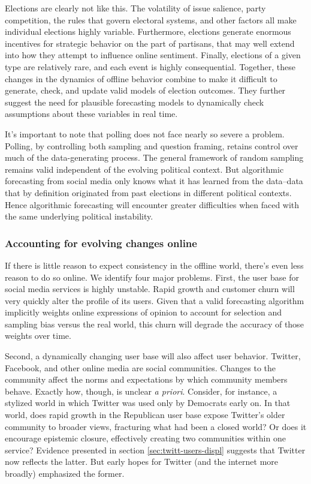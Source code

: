 \documentclass{article}
\begin{document}
Elections are clearly not like this. The volatility of issue salience,
party competition, the rules that govern electoral systems, and other
factors all make individual elections highly variable. Furthermore,
elections generate enormous incentives for strategic behavior on the
part of partisans, that may well extend into how they attempt to
influence online sentiment. Finally, elections of a given type are
relatively rare, and each event is highly consequential. Together,
these changes in the dynamics of offline behavior combine to make it
difficult to generate, check, and update valid models of election
outcomes. They further suggest the need for plausible forecasting
models to dynamically check assumptions about these variables in real
time. 

It's important to note that polling does not face nearly so severe a
problem. Polling, by controlling both sampling and question framing,
retains control over much of the data-generating process. The general
framework of random sampling remains valid independent of the evolving
political context. But algorithmic forecasting from social media only
knows what it has learned from the data--data that by definition
originated from past elections in different political contexts. Hence
algorithmic forecasting will encounter greater difficulties when faced
with the same underlying political instability.


\subsubsection{Accounting for evolving changes online}
\label{sec:acco-evolv-chang-1}

If there is little reason to expect consistency in the offline world,
there's even less reason to do so online. We identify four major
problems. First, the user base for social media services is highly
unstable. Rapid growth and customer churn will very quickly alter the
profile of its users. Given that a valid forecasting algorithm
implicitly weights online expressions of opinion to account for
selection and sampling bias versus the real world, this churn will
degrade the accuracy of those weights over time.

Second, a dynamically changing user base will also affect user
behavior. Twitter, Facebook, and other online media are social
communities. Changes to the community affect the norms and
expectations by which community members behave. Exactly how, though,
is unclear \textit{a priori}. Consider, for instance, a stylized world
in which Twitter was used only by Democrats early on. In that world,
does rapid growth in the Republican user base expose Twitter's older
community to broader views, fracturing what had been a closed world?
Or does it encourage epistemic closure, effectively creating two
communities within one service? Evidence presented in section
\ref{sec:twitt-users-displ} suggests that Twitter now reflects the
latter. But early hopes for Twitter (and the internet more broadly)
emphasized the former. 
\end{document}
